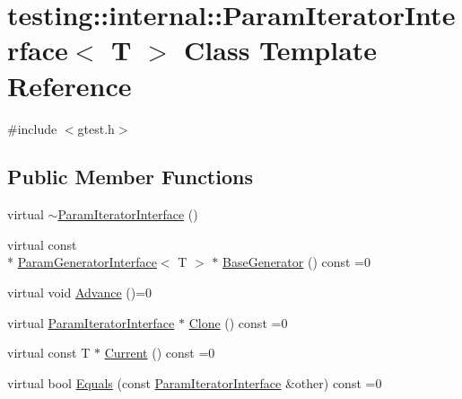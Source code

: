 \hypertarget{classtesting_1_1internal_1_1_param_iterator_interface}{\section{testing\-:\-:internal\-:\-:Param\-Iterator\-Interface$<$ T $>$ Class Template Reference}
\label{classtesting_1_1internal_1_1_param_iterator_interface}
}


{\ttfamily \#include $<$gtest.\-h$>$}

\subsection*{Public Member Functions}
\begin{DoxyCompactItemize}
\item 
virtual \hyperlink{classtesting_1_1internal_1_1_param_iterator_interface_adf6ba49e6b54a6e3b15dbd5733988bef}{$\sim$\-Param\-Iterator\-Interface} ()
\item 
virtual const \\*
\hyperlink{classtesting_1_1internal_1_1_param_generator_interface}{Param\-Generator\-Interface}$<$ T $>$ $\ast$ \hyperlink{classtesting_1_1internal_1_1_param_iterator_interface_a17500953df75ecda1ace46c08ff731e9}{Base\-Generator} () const =0
\item 
virtual void \hyperlink{classtesting_1_1internal_1_1_param_iterator_interface_a600dbd35fcb551463e379516a1abea48}{Advance} ()=0
\item 
virtual \hyperlink{classtesting_1_1internal_1_1_param_iterator_interface}{Param\-Iterator\-Interface} $\ast$ \hyperlink{classtesting_1_1internal_1_1_param_iterator_interface_a4998c23e27e2943d97546011aa35db80}{Clone} () const =0
\item 
virtual const T $\ast$ \hyperlink{classtesting_1_1internal_1_1_param_iterator_interface_adfff808576d929085679c315b255af7e}{Current} () const =0
\item 
virtual bool \hyperlink{classtesting_1_1internal_1_1_param_iterator_interface_a9d811697a752d46f7bd6a0082f9040a3}{Equals} (const \hyperlink{classtesting_1_1internal_1_1_param_iterator_interface}{Param\-Iterator\-Interface} \&other) const =0
\end{DoxyCompactItemize}


